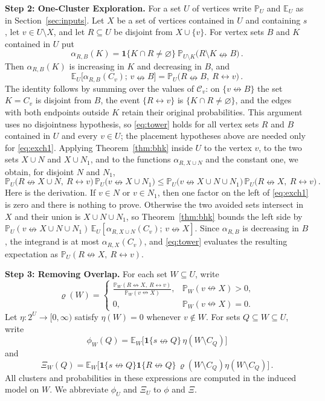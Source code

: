 \documentclass[11pt]{article}
\theoremstyle{definition}
\theoremstyle{remark}
\newcommand{\PP}{\mathbb P}
\newcommand{\EE}{\mathbb E}
\newcommand{\one}{\mathbf 1}
\newcommand{\con}{\leftrightarrow}
\newcommand{\ncon}{\nleftrightarrow}
\newcommand{\eC}{\mathcal C}
\begin{document}
\medskip\noindent\textbf{Step 2: One-Cluster Exploration.}
For a set $U$ of vertices write $\PP_U$ and $\EE_U$ as in Section~\ref{sec:inputs}. Let $X$
be a set of vertices contained in $U$ and containing $s$, let $v\in U\setminus X$, and let
$R\subseteq U$ be disjoint from $X\cup\{v\}$. For vertex sets $B$ and $K$ contained in $U$ put
\begin{equation}\label{eq:alpha}
 \alpha_{R,B}(K)=\one\{K\cap R\neq\varnothing\}\ \PP_{U\setminus K}\bigl(R\setminus K\ncon
 B\bigr)\,.
\end{equation}
Then $\alpha_{R,B}(K)$ is increasing in $K$ and decreasing in $B$, and
\begin{equation}\label{eq:tower}
 \EE_U\bigl[\alpha_{R,B}(C_v);\,v\ncon B\bigr]=\PP_U\bigl(R\ncon B,\ R\con v\bigr)\,.
\end{equation}
The identity follows by summing over the values of $\eC_v$: on $\{v\ncon B\}$ the set
$K=C_v$ is disjoint from $B$, the event $\{R\con v\}$ is
$\{K\cap R\neq\varnothing\}$, and the edges with both endpoints outside $K$ retain their
original probabilities. This argument uses no disjointness hypothesis, so \eqref{eq:tower}
holds for all vertex sets $R$ and $B$ contained in $U$ and every $v\in U$; the placement
hypotheses above are needed only for \eqref{eq:exch1}. Applying
Theorem~\ref{thm:bhk} inside $U$ to the vertex $v$, to the two sets $X\cup N$ and $X\cup
N_1$, and to the functions $\alpha_{R,X\cup N}$ and the constant one, we obtain, for
disjoint $N$ and $N_1$,
\begin{equation}\label{eq:exch1}
 \PP_U\bigl(R\ncon X\cup N,\ R\con v\bigr)\,\PP_U\bigl(v\ncon X\cup N_1\bigr)
\leq \PP_U\bigl(v\ncon X\cup N\cup N_1\bigr)\,\PP_U\bigl(R\ncon X,\ R\con v\bigr)\,.
\end{equation}
Here is the derivation. If $v\in N$ or $v\in N_1$, then one factor on the left of
\eqref{eq:exch1} is zero and there is nothing to prove. Otherwise the two avoided sets
intersect in $X$ and their union is $X\cup N\cup N_1$, so Theorem~\ref{thm:bhk} bounds the
left side by
$\PP_U(v\ncon X\cup N\cup N_1)\,\EE_U[\alpha_{R,X\cup N}(C_v);\,v\ncon X]$. Since
$\alpha_{R,B}$ is decreasing in $B$, the integrand is at most $\alpha_{R,X}(C_v)$, and
\eqref{eq:tower} evaluates the resulting expectation as
$\PP_U(R\ncon X,\ R\con v)$.

\medskip\noindent\textbf{Step 3: Removing Overlap.}
For each set $W\subseteq U$, write
\[
 \varrho(W)=
 \begin{cases}
 \displaystyle
 \frac{\PP_W(R\ncon X,\ R\con v)}{\PP_W(v\ncon X)},
     &\PP_W(v\ncon X)>0,\\[6pt]
 0,&\PP_W(v\ncon X)=0.
 \end{cases}
\]
Let $\eta:2^U\to[0,\infty)$ satisfy $\eta(W)=0$ whenever
$v\notin W$. For sets $Q\subseteq W\subseteq U$, write
\[
 \phi_W(Q)=\EE_W\bigl[\one\{s\ncon Q\}\,\eta(W\setminus C_Q)\bigr]
\]
and
\[
 \Xi_W(Q)=\EE_W\bigl[\one\{s\ncon Q\}\one\{R\ncon Q\}\,
       \varrho(W\setminus C_Q)\eta(W\setminus C_Q)\bigr]\,.
\]
All clusters and probabilities in these expressions are computed in the induced model on
$W$. We abbreviate $\phi_U$ and $\Xi_U$ to $\phi$ and $\Xi$.
\end{document}
